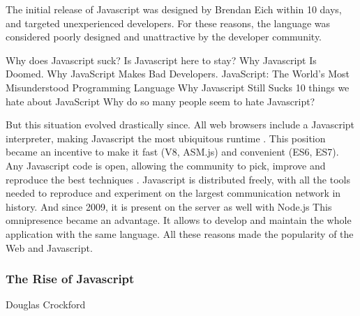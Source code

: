 The initial release of Javascript was designed by Brendan Eich within 10 days, and targeted unexperienced developers.
For these reasons, the language was considered poorly designed and unattractive by the developer community.

{
\fontsize{10pt}{10pt}\selectfont
Why does Javascript suck?
Is Javascript here to stay?
Why Javascript Is Doomed.
Why JavaScript Makes Bad Developers.
JavaScript: The World's Most Misunderstood Programming Language
Why Javascript Still Sucks
10 things we hate about JavaScript
Why do so many people seem to hate Javascript?
}

But this situation evolved drastically since.
All web browsers include a Javascript interpreter, making Javascript the most ubiquitous runtime \cite{Flanagan2006}.
This position became an incentive to make it fast (V8, ASM.js) and convenient (ES6, ES7).
Any Javascript code is open, allowing the community to pick, improve and reproduce the best techniques .
Javascript is distributed freely, with all the tools needed to reproduce and experiment on the largest communication network in history.
And since 2009, it is present on the server as well with Node.js
This omnipresence became an advantage.
It allows to develop and maintain the whole application with the same language.
All these reasons made the popularity of the Web and Javascript.



\subsubsection{The Rise of Javascript}

%
{Douglas Crockford}

